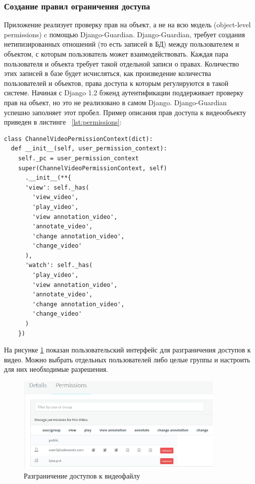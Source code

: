 \subsubsection{Создание правил ограничения доступа}

Приложение реализует проверку прав на объект, а не на всю модель (object-level permissions) c помощью Django-Guardian.
Django-Guardian, требует создания нетипизированных отношений (то есть записей в БД) между пользователем и объектом,
с которым пользователь может взаимодействовать. Каждая пара пользователя и объекта требует такой отдельной записи о правах.
Количество этих записей в базе будет исчисляться, как произведение количества пользователей и объектов,
права доступа к которым регулируются в такой системе.
Начиная с Django 1.2 бэкенд аутентификации поддерживает проверку прав на объект, но это не реализовано в самом Django.
Django-Guardian успешно заполняет этот пробел. Пример описания прав доступа к видеообъекту
приведен в листинге ~\ref{lst:permissions}:

\FloatBarrier
\begin{lstlisting}[caption={Пример описания прав доступа}, label=lst:permissions]
class ChannelVideoPermissionContext(dict):
  def __init__(self, user_permission_context):
    self._pc = user_permission_context
    super(ChannelVideoPermissionContext, self)
      .__init__(**{
      'view': self._has(
        'view_video',
        'play_video',
        'view annotation_video',
        'annotate_video',
        'change annotation_video',
        'change_video'
      ),
      'watch': self._has(
        'play_video',
        'view annotation_video',
        'annotate_video',
        'change annotation_video',
        'change_video'
      )
    })
\end{lstlisting}
\FloatBarrier

На рисунке \ref{permissions} показан пользовательский интерфейс для разграничения доступов к видео. Можно
выбрать отдельных пользователей либо целые группы и настроить для них необходимые разрешения.
\begin{figure}
  \centering
  \includegraphics[width=0.9\textwidth]{images/permissions.jpg}
  \caption{Разграничение доступов к видеофайлу}\label{permissions}
\end{figure}

